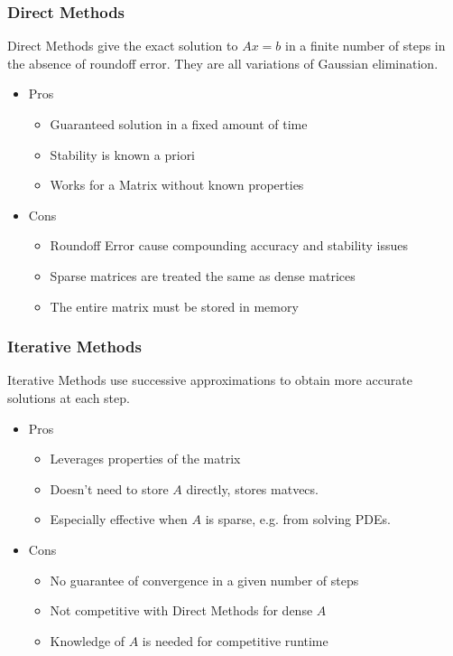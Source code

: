 \documentclass{beamer}
\begin{document}
    \begin{frame}
      \frametitle{Direct Methods}
      Direct Methods give the exact solution to $Ax = b$ in a finite number of steps in the absence of roundoff error.
      They are all variations of Gaussian elimination.
       \begin{itemize}
         \item Pros
           \begin{itemize}
             \item Guaranteed solution in a fixed amount of time
             \item Stability is known a priori
             \item Works for a Matrix without known properties
           \end{itemize}
         \item Cons
           \begin{itemize}
             \item Roundoff Error cause compounding accuracy and stability issues
             \item Sparse matrices are treated the same as dense matrices
             \item The entire matrix must be stored in memory
           \end{itemize}
      \end{itemize}
    \end{frame}

    \begin{frame}
      \frametitle{Iterative Methods}
      Iterative Methods use successive approximations to obtain more accurate solutions at each step.
      \begin{itemize}
        \item Pros
          \begin{itemize}
            \item Leverages properties of the matrix
            \item Doesn't need to store $A$ directly, stores matvecs.
            \item Especially effective when $A$ is sparse, e.g. from solving PDEs.
          \end{itemize}
        \item Cons
          \begin{itemize}
            \item No guarantee of convergence in a given number of steps
            \item Not competitive with Direct Methods for dense $A$
            \item Knowledge of  $A$ is needed for competitive runtime
          \end{itemize}
      \end{itemize}
    \end{frame}
\end{document}
